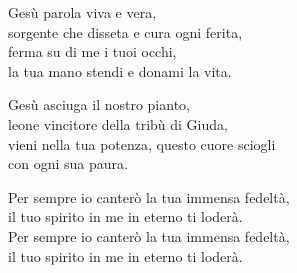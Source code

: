 
\strofa Gesù parola viva e vera,\\
sorgente che disseta e cura ogni ferita,\\
ferma su di me i tuoi occhi,\\
la tua mano stendi e donami la vita.

\spazio


\spazio

\strofa Gesù asciuga il nostro pianto,\\
leone vincitore della tribù di Giuda,\\
vieni nella tua potenza, questo cuore sciogli\\
con ogni sua paura.

\spazio


\spazio

\strofa Per sempre io canterò la tua immensa fedeltà,\\
il tuo spirito in me in eterno ti loderà.\\
Per sempre io canterò la tua immensa fedeltà,\\
il tuo spirito in me in eterno ti loderà.

\spazio

